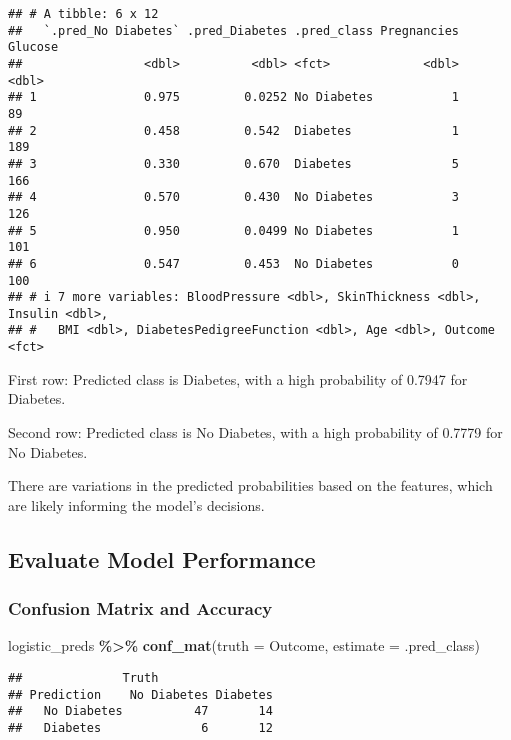 \documentclass[
]{article}
\newenvironment{Shaded}{\begin{snugshade}}{\end{snugshade}}
\newcommand{\AttributeTok}[1]{\textcolor[rgb]{0.13,0.29,0.53}{#1}}
\newcommand{\FunctionTok}[1]{\textcolor[rgb]{0.13,0.29,0.53}{\textbf{#1}}}
\newcommand{\NormalTok}[1]{#1}
\newcommand{\SpecialCharTok}[1]{\textcolor[rgb]{0.81,0.36,0.00}{\textbf{#1}}}
\begin{document}
\begin{verbatim}
## # A tibble: 6 x 12
##   `.pred_No Diabetes` .pred_Diabetes .pred_class Pregnancies Glucose
##                 <dbl>          <dbl> <fct>             <dbl>   <dbl>
## 1               0.975         0.0252 No Diabetes           1      89
## 2               0.458         0.542  Diabetes              1     189
## 3               0.330         0.670  Diabetes              5     166
## 4               0.570         0.430  No Diabetes           3     126
## 5               0.950         0.0499 No Diabetes           1     101
## 6               0.547         0.453  No Diabetes           0     100
## # i 7 more variables: BloodPressure <dbl>, SkinThickness <dbl>, Insulin <dbl>,
## #   BMI <dbl>, DiabetesPedigreeFunction <dbl>, Age <dbl>, Outcome <fct>
\end{verbatim}

First row: Predicted class is Diabetes, with a high probability of
0.7947 for Diabetes.

Second row: Predicted class is No Diabetes, with a high probability of
0.7779 for No Diabetes.

There are variations in the predicted probabilities based on the
features, which are likely informing the model's decisions.

\subsection{Evaluate Model
Performance}\label{evaluate-model-performance}

\subsubsection{Confusion Matrix and
Accuracy}\label{confusion-matrix-and-accuracy}

\begin{Shaded}
\begin{Highlighting}[]
\NormalTok{logistic\_preds }\SpecialCharTok{\%\textgreater{}\%}
  \FunctionTok{conf\_mat}\NormalTok{(}\AttributeTok{truth =}\NormalTok{ Outcome, }\AttributeTok{estimate =}\NormalTok{ .pred\_class)}
\end{Highlighting}
\end{Shaded}

\begin{verbatim}
##              Truth
## Prediction    No Diabetes Diabetes
##   No Diabetes          47       14
##   Diabetes              6       12
\end{verbatim}
\end{document}
